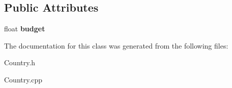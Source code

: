 \subsection*{Public Attributes}
\begin{DoxyCompactItemize}
\item 
\hypertarget{classCountry_a1db56101d06cc97b2be2a68607f4ac48}{float {\bfseries budget}}\label{classCountry_a1db56101d06cc97b2be2a68607f4ac48}

\end{DoxyCompactItemize}


The documentation for this class was generated from the following files\+:\begin{DoxyCompactItemize}
\item 
Country.\+h\item 
Country.\+cpp\end{DoxyCompactItemize}
